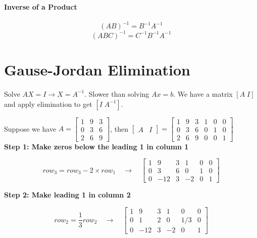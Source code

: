 \paragraph{Inverse of a Product}
\begin{mdframed}
    \[
        (AB)^{-1} = B^{-1}A^{-1}
    \]
    \[
        (ABC)^{-1} = C^{-1}B^{-1}A^{-1}
    \]
\end{mdframed}

\section{Gause-Jordan Elimination}


Solve $AX = I \rightarrow X = A^{-1}$. Slower than solving $Ax = b$. We have a matrix $[A \; I]$ and apply elimination to get $[I \; A^{-1}]$.
\vspace{10pt}

\noindent Suppose we have $A = \begin{bmatrix}
        1 & 9 & 3 \\
        0 & 3 & 6 \\
        2 & 6 & 9
    \end{bmatrix}$, then
$\begin{bmatrix} A & I \end{bmatrix}
    =
    \left[
        \begin{array}{ccc|ccc}
            1 & 9 & 3 & 1 & 0 & 0 \\
            0 & 3 & 6 & 0 & 1 & 0 \\
            2 & 6 & 9 & 0 & 0 & 1
        \end{array}
        \right]$ \\

\vspace{8pt}
\noindent \textbf{Step 1: Make zeros below the leading 1 in column 1}

\[
    row_3 = row_3 - 2 \times row_1 \quad \rightarrow \quad \left[
        \begin{array}{ccc|ccc}
            1 & 9   & 3 & 1  & 0 & 0 \\
            0 & 3   & 6 & 0  & 1 & 0 \\
            0 & -12 & 3 & -2 & 0 & 1
        \end{array}
        \right]
\]

\noindent \textbf{Step 2: Make leading 1 in column 2}

\[
    row_2 = \frac{1}{3}row_2 \quad \rightarrow \quad \left[
        \begin{array}{ccc|ccc}
            1 & 9   & 3 & 1  & 0   & 0 \\
            0 & 1   & 2 & 0  & 1/3 & 0 \\
            0 & -12 & 3 & -2 & 0   & 1
        \end{array}
        \right]
\]


